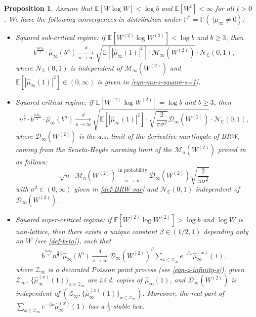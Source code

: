 \documentclass[12pt]{amsart}
\newtheorem{proposition}[theorem]{Proposition}
\theoremstyle{definition}
\theoremstyle{remark}
\newcommand{\C}{\mathbb{C}}
\newcommand{\E}{\mathbb{E}}
\newcommand{\PP}{\mathbb{P}}
\numberwithin{equation}{section}
\begin{document}
\begin{proposition}\label{prop-clt}
Assume that $\E[W\log W]<\log b$ and $\E[W^t]<\infty$ for all $t>0$.  We have the following convergences in distribution  under $\PP^* = \PP(\cdot | \mu_\infty\ne 0)$:
\begin{itemize}
\item Squared sub-critical regime: if $\E[ W^{(2)} \log W^{(2)}] < \log b$ and $b\ge 3$, then 
\[
b^{\frac{nD_F}{2}} \cdot  \widehat{\mu}_\infty(b^n)  \xrightarrow[n\to\infty]{\quad d \quad }      \sqrt{ \E[|\widehat{\mu}_\infty(1)|^2] \cdot  \mathscr{M}_\infty(W^{(2)})} \cdot \mathcal{N}_{\C}(0,1),
\]
where $\mathcal{N}_{\C}(0,1)$ is  independent of $\mathscr{M}_\infty(W^{(2)})$ and $\E[|\widehat{\mu}_\infty(1)|^2]\in (0,\infty) $ is given in \eqref{eqn-mu-s-square-s=1}. 
\item  Squared critical regime:  if $\E[ W^{(2)} \log W^{(2)}]  = \log b$ and $b \ge 3$, then 
\[
n^{\frac{1}{4}} \cdot b^{\frac{nD_F}{2}} \cdot  \widehat{\mu}_\infty(b^n)  \xrightarrow[n\to\infty]{\quad d \quad }      \sqrt{ \E[|\widehat{\mu}_\infty(1)|^2] \cdot  \sqrt{\frac{2}{\pi \sigma^2}}  \mathscr{D}_\infty(W^{(2)})} \cdot \mathcal{N}_{\C}(0,1),
\]
where $\mathscr{D}_\infty(W^{(2)})$ is the a.s. limit of the derivative martingale of BRW,  coming from the Seneta-Heyde norming limit of the $\mathscr{M}_n(W^{(2)})$  proved in \cite{Aideon-Shi} as follows: 
\[
 \sqrt{n} \cdot  \mathscr{M}_n(W^{(2)}) \xrightarrow[n\to\infty]{\text{in probability}} \mathscr{D}_\infty(W^{(2)}) \sqrt{\frac{2}{\pi \sigma^2}} 
\]
   with $\sigma^2\in(0,\infty)$ given in \eqref{def-BRW-var} and  $\mathcal{N}_\C(0,1)$  independent of $\mathscr{D}_\infty(W^{(2)})$.
   \item Squared super-critical regime:  if $\E[ W^{(2)} \log W^{(2)}] > \log b$ and $\log W$ is non-lattice, then there exists  a unique constant $\beta\in (1/2,1)$ depending only on $W$ (see \eqref{def-beta}), such that  
 \begin{align*}
b^{\frac{n D_F}{2}}n^{\frac{3}{2}\beta} \widehat{\mu}_{\infty}\left(b^{n}\right)\xrightarrow[n\rightarrow\infty]{d}  \mathscr{D}_\infty(W^{(2)})^\beta \sum_{x \in \mathcal{Z}_\infty} e^{-\beta x}\widehat{\mu}^{(x)}_\infty(1),
 \end{align*}
 where $\mathcal{Z}_\infty$ is a  decorated Poisson point process  (see  \eqref{eqn-z-infinity-s}), given $\mathcal{Z}_\infty$, $\{\widehat{\mu}^{(x)}_\infty(1)\}_{x\in \mathcal{Z}_\infty}$ are i.i.d. copies of $\widehat{\mu}_\infty(1)$,  and $\mathscr{D}_\infty(W^{(2)})$ is independent of $(\mathcal{Z}_\infty, \{\widehat{\mu}^{(x)}_\infty(1)\}_{x\in \mathcal{Z}_\infty})$.  Moreover, the real part of $ \sum_{x \in \mathcal{Z}_\infty} e^{-\beta x}\widehat{\mu}^{(x)}_\infty(1)$ has a $\frac{1}{\beta}$-stable law. 
\end{itemize}
\end{proposition}
\end{document}
